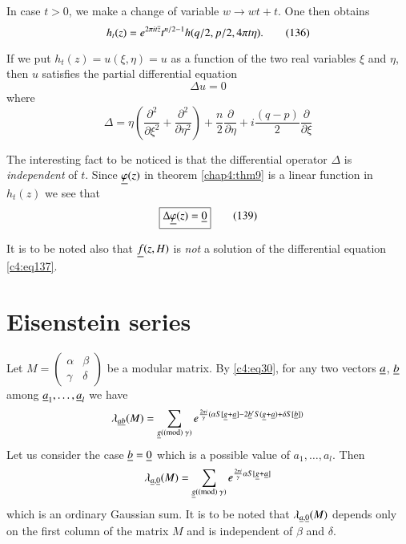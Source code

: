 In case $t>0$, we make a change of variable $w\to wt+t$. One then
obtains
\begin{equation*}
h_{t}(z)=e^{2\pi it\overline{z}}t^{n/2-1}h(q/2,p/2,4\pi t\eta).\tag{136}\label{c4:eq136}
\end{equation*}

If we put $h_{t}(z)=u(\xi,\eta)=u$ as a function of the two real
variables $\xi$ and $\eta$, then $u$ satisfies the partial
differential equation
\begin{equation*}
\Delta u=0\tag{137}\label{c4:eq137}
\end{equation*}
where
\begin{equation*}
\Delta=\eta \left(\frac{\partial^{2}}{\partial\xi^{2}} +
\frac{\partial^{2}}{\partial\eta^{2}}\right) +
 \frac{n}{2}\frac{\partial}{\partial\eta} + 
i\frac{(q-p)}{2}\frac{\partial}{\partial\xi}\tag{138}\label{c4:eq138} 
\end{equation*}

The interesting fact to be noticed is that the differential operator
$\Delta$ is {\em independent} of $t$. Since $\underline{\varphi}(z)$ in
theorem \ref{chap4:thm9} is a linear function in $h_{t}(z)$ we see that
\begin{equation*}
\boxed{\Delta\underline{\varphi}(z)=\underline{0}}\tag{139}\label{c4:eq139}
\end{equation*}

It is to be noted also that $\underline{f}(z,H)$ is {\em not} a solution of
the differential equation \eqref{c4:eq137}.

\section{Eisenstein series}\label{chap4:sec8}

Let $M=\left(\begin{smallmatrix} \alpha & \beta\\ \gamma & \delta
\end{smallmatrix}\right)$ be a modular matrix. By \eqref{c4:eq30}, for any
two vectors $\underline{a}$, $\underline{b}$ among $\underline{a}_{1},\ldots,\underline{a}_{l}$ we
have
$$
\lambda_{\underline{a}\underline{b}}(M)=\sum_{\underline{g}(\rm(mod) \; \gamma)}e^{\frac{2\pi
    i}{\gamma}(\alpha S[\underline{g}+\underline{a}]-2\underline{b}'S(\underline{g}+\underline{a})+\delta
  S[\underline{b}])} 
$$
Let us consider the case $\underline{b}=\underline{0}$ which is a possible value of
$a_{1},\ldots,a_{l}$. Then 
$$
\lambda_{\underline{a},\underline{0}}(M)=\sum_{\underline{g}(\rm(mod) \; \gamma)}e^{\frac{2\pi
    i}{\gamma}\alpha S[\underline{g}+\underline{a}]} 
$$\pageoriginale
which is an ordinary Gaussian sum. It is to be noted that
$\lambda_{\underline{a},\underline{0}}(M)$ depends only on the first column of the
matrix $M$ and is independent of $\beta$ and $\delta$.

